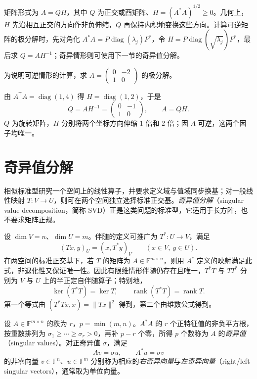矩阵形式为 $A=QH$，其中 $Q$ 为正交或酉矩阵、$H=(A^*A)^{1/2}\geq0$。几何上，$H$ 先沿相互正交的方向作非负伸缩，$Q$ 再保持内积地变换这些方向。计算可逆矩阵的极分解时，先对角化 $A^*A=P\operatorname{diag}(\lambda_j)P^*$，令 $H=P\operatorname{diag}(\sqrt{\lambda_j})P^*$，最后求 $Q=AH^{-1}$；奇异情形则可使用下一节的奇异值分解。

\begin{example}
为说明可逆情形的计算，求 $A=\begin{pmatrix}0&-2\\1&0\end{pmatrix}$ 的极分解。
\end{example}
\begin{solve}
由 $A^{\mathsf T}A=\operatorname{diag}(1,4)$ 得 $H=\operatorname{diag}(1,2)$，于是
\[
    Q=AH^{-1}=\begin{pmatrix}0&-1\\1&0\end{pmatrix},\qquad
    A=QH.
\]
$Q$ 为旋转矩阵，$H$ 分别将两个坐标方向伸缩 $1$ 倍和 $2$ 倍；因 $A$ 可逆，这两个因子均唯一。
\end{solve}

\section{奇异值分解}
\label{sec:singular-value-decomposition}

相似标准型研究一个空间上的线性算子，并要求定义域与值域同步换基；对一般线性映射 $T:V\to U$，则可在两个空间独立选择标准正交基。\emph{奇异值分解}（singular value decomposition，简称 SVD）正是这类问题的标准型，它适用于长方阵，也不要求矩阵正规。

设 $\dim V=n$、$\dim U=m$。伴随的定义可推广为 $T^*:U\to V$，满足
\[
    (Tx,y)_U=(x,T^*y)_V\qquad(x\in V,\ y\in U).
\]
在两空间的标准正交基下，若 $T$ 的矩阵为 $A\in\mathbb F^{m\times n}$，则用 $A^*$ 定义的映射满足此式，非退化性又保证唯一性。因此有限维情形伴随仍存在且唯一，$T^*T$ 与 $TT^*$ 分别为 $V$ 与 $U$ 上的半正定自伴随算子；特别地，
\[
    \ker(T^*T)=\ker T,\qquad
    \operatorname{rank}(T^*T)=\operatorname{rank}T.
\]
第一个等式由 $(T^*Tx,x)=\|Tx\|^2$ 得到，第二个由维数公式得到。

\begin{definition}
\label{def:singular-values}
设 $A\in\mathbb F^{m\times n}$ 的秩为 $r$，$p=\min(m,n)$。$A^*A$ 的 $r$ 个正特征值的非负平方根，按重数排列为 $\sigma_1\geq\cdots\geq\sigma_r>0$，再补 $p-r$ 个零，所得 $p$ 个数称为 $A$ 的\emph{奇异值}（singular values）。对正奇异值 $\sigma$，满足
\[
    Av=\sigma u,\qquad A^*u=\sigma v
\]
的非零向量 $v\in\mathbb F^n$、$u\in\mathbb F^m$ 分别称为相应的\emph{右奇异向量}与\emph{左奇异向量}（right/left singular vectors），通常取为单位向量。
\end{definition}

